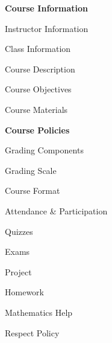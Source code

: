 \documentclass[11pt,letterpaper]{article}
\begin{document}
\mytitle




\begin{minipage}[t]{0.45\textwidth}
{\bfseries\color{stacred} Course Information} \dotfill \pageref{course_info} \par
\hspace{0.3cm} Instructor Information \dotfill \pageref{instr_info} \par
\hspace{0.3cm} Class Information \dotfill \pageref{class_info} \par
\hspace{0.3cm} Course Description \dotfill \pageref{course_desc} \par
\hspace{0.3cm} Course Objectives \dotfill \pageref{course_obj} \par
\hspace{0.3cm} Course Materials \dotfill \pageref{course_mat} \par
{\bfseries\color{stacred} Course Policies} \dotfill \pageref{course_polc} \par
\hspace{0.3cm} Grading Components \dotfill \pageref{grade_comp} \par
\hspace{0.3cm} Grading Scale \dotfill \pageref{grade_scale} \par
\hspace{0.3cm} Course Format \dotfill \pageref{course_form} \par
\hspace{0.3cm} Attendance \& Participation \dotfill \pageref{attend} \par
\hspace{0.3cm} Quizzes \dotfill \pageref{quiz} \par
\hspace{0.3cm} Exams \dotfill \pageref{exams} \par
\hspace{0.3cm} Project \dotfill \pageref{project} \par
\hspace{0.3cm} Homework \dotfill \pageref{hw} \par
\hspace{0.3cm} Mathematics Help \dotfill \pageref{help} \par
\hspace{0.3cm} Respect Policy \dotfill \pageref{respect} \par

\end{minipage}
\end{document}

